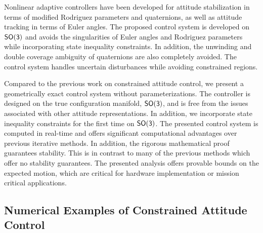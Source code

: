 Nonlinear adaptive controllers have been developed for attitude stabilization in terms of modified Rodriguez parameters and quaternions, as well as attitude tracking in terms of Euler angles. 
The proposed control system is developed on \(\mathsf{SO(3)}\) and avoids the singularities of Euler angles and Rodriguez parameters while incorporating state inequality constraints. 
In addition, the unwinding and double coverage ambiguity of quaternions are also completely avoided. 
The control system handles uncertain disturbances while avoiding constrained regions.

Compared to the previous work on constrained attitude control, we present a geometrically exact control system without parameterizations.
The controller is designed on the true configuration manifold, \( \mathsf{SO(3)} \), and is free from the issues associated with other attitude representations.
In addition, we incorporate state inequality constraints for the first time on \( \mathsf{SO(3)} \).
The presented control system is computed in real-time and offers significant computational advantages over previous iterative methods. 
In addition, the rigorous mathematical proof guarantees stability.
This is in contrast to many of the previous methods which offer no stability guarantees.
The presented analysis offers provable bounds on the expected motion, which are critical for hardware implementation or mission critical applications.

\subsection{Numerical Examples of Constrained Attitude Control}\label{sec:constrained_attitude_control_numerical_example}

